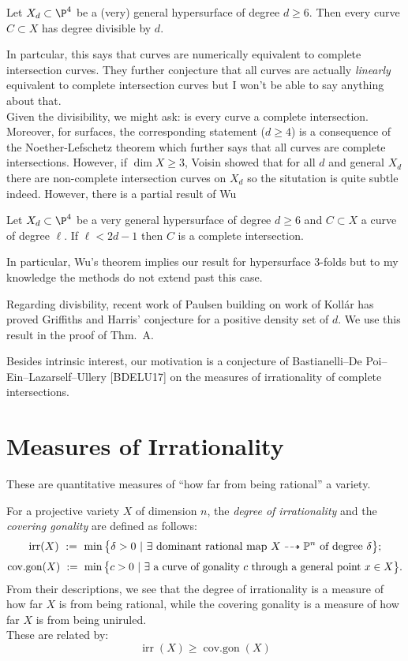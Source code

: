 \documentclass[12pt]{article}
\theoremstyle{plain}
\DeclareMathOperator{\irr}{irr}
\DeclareMathOperator{\cov}{cov.gon}
\newcommand{\mb}[1]{\mathbb{#1}}
\DeclareMathOperator{\cg}{cov.gon}
\begin{document}
\begin{conj}
Let $X_d \subset \P^4$ be a (very) general hypersurface of degree $d \ge 6$. Then every curve $C \subset X$ has degree divisible by $d$. 
\end{conj}

In partcular, this says that curves are numerically equivalent to complete intersection curves. They further conjecture that all curves are actually \textit{linearly} equivalent to complete intersection curves but I won't be able to say anything about that. 
\bigskip\\
{\color{red} Given the divisibility, we might ask: is every curve a complete intersection.
Moreover, for surfaces, the corresponding statement ($d \ge 4$) is a consequence of the Noether-Lefschetz theorem which further says that all curves are complete intersections. However, if $\dim{X} \ge 3$, Voisin showed that for all $d$ and general $X_d$ there are non-complete intersection curves on $X_d$ so the situtation is quite subtle indeed. However, there is a partial result of Wu}

\begin{theorem}[Wu, '90]
Let $X_d \subset \P^4$ be a very general hypersurface of degree $d \ge 6$ and $C \subset X$ a curve of degree $\ell$. If $\ell < 2d - 1$ then $C$ is a complete intersection.
\end{theorem}

{\color{red} In particular, Wu's theorem implies our result for hypersurface 3-folds but to my knowledge the methods do not extend past this case.}

Regarding divisbility, recent work of Paulsen building on work of Koll\'{a}r has proved Griffiths and Harris' conjecture for a positive density set of $d$. We use this result in the proof of Thm.~A.

{\color{red} Besides intrinsic interest, our motivation is a conjecture of Bastianelli--De Poi--Ein--Lazarself--Ullery [BDELU17] on the measures of irrationality of complete intersections.}

\section{Measures of Irrationality}

{\color{red} These are quantitative measures of ``how far from being rational'' a variety. }

For a projective variety $X$ of dimension $n$, the \emph{degree of irrationality} and the \emph{covering gonality} are defined as follows:
\[ \irr(X)\ :=\ \min\big\{\delta>0\ |\ \exists\textup{ dominant rational map } X\dashrightarrow \mb{P}^n\textup{ of degree }\delta\big\}; \]
\[ \cov(X)\ :=\ \min\big\{c>0\ |\ \exists\textup{ a curve of gonality } c \textup{ through a general point } x\in X\big\}.\]
{\color{red} From their descriptions, we see that the degree of irrationality is a measure of how far $X$ is from being rational, while the covering gonality is a measure of how far $X$ is from being uniruled.} 
\bigskip\\
These are related by: 
\[ \irr(X) \geq \cg(X) \]
\end{document}
